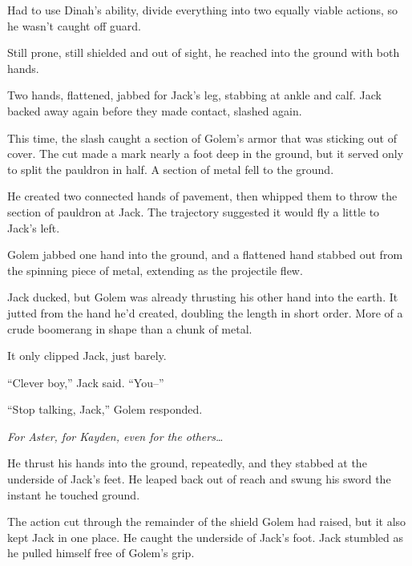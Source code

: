 Had to use Dinah's ability, divide everything into two equally viable actions, so he wasn't caught off guard.



Still prone, still shielded and out of sight, he reached into the ground with both hands.



Two hands, flattened, jabbed for Jack's leg, stabbing at ankle and calf.  Jack backed away again before they made contact, slashed again.



This time, the slash caught a section of Golem's armor that was sticking out of cover.  The cut made a mark nearly a foot deep in the ground, but it served only to split the pauldron in half.  A section of metal fell to the ground.



He created two connected hands of pavement, then whipped them to throw the section of pauldron at Jack.  The trajectory suggested it would fly a little to Jack's left.



Golem jabbed one hand into the ground, and a flattened hand stabbed out from the spinning piece of metal, extending as the projectile flew.



Jack ducked, but Golem was already thrusting his other hand into the earth.  It jutted from the hand he'd created, doubling the length in short order.  More of a crude boomerang in shape than a chunk of metal.



It only clipped Jack, just barely.



``Clever boy,'' Jack said.  ``You--''



``Stop talking, Jack,'' Golem responded.



\emph{For Aster, for Kayden, even for the others\ldots}



He thrust his hands into the ground, repeatedly, and they stabbed at the underside of Jack's feet.  He leaped back out of reach and swung his sword the instant he touched ground.



The action cut through the remainder of the shield Golem had raised, but it also kept Jack in one place.  He caught the underside of Jack's foot.  Jack stumbled as he pulled himself free of Golem's grip.



